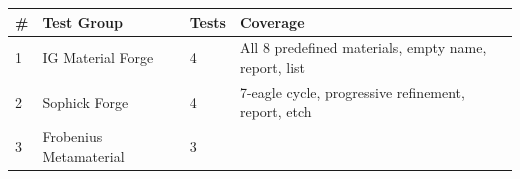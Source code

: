 \begin{longtable}[]{@{}llll@{}}
\toprule
\begin{minipage}[b]{0.09\columnwidth}\raggedright
\#\strut
\end{minipage} & \begin{minipage}[b]{0.31\columnwidth}\raggedright
Test Group\strut
\end{minipage} & \begin{minipage}[b]{0.20\columnwidth}\raggedright
Tests\strut
\end{minipage} & \begin{minipage}[b]{0.29\columnwidth}\raggedright
Coverage\strut
\end{minipage}\tabularnewline
\midrule
\endhead
\begin{minipage}[t]{0.09\columnwidth}\raggedright
1\strut
\end{minipage} & \begin{minipage}[t]{0.31\columnwidth}\raggedright
IG Material Forge\strut
\end{minipage} & \begin{minipage}[t]{0.20\columnwidth}\raggedright
4\strut
\end{minipage} & \begin{minipage}[t]{0.29\columnwidth}\raggedright
All 8 predefined materials, empty name, report, list\strut
\end{minipage}\tabularnewline
\begin{minipage}[t]{0.09\columnwidth}\raggedright
2\strut
\end{minipage} & \begin{minipage}[t]{0.31\columnwidth}\raggedright
Sophick Forge\strut
\end{minipage} & \begin{minipage}[t]{0.20\columnwidth}\raggedright
4\strut
\end{minipage} & \begin{minipage}[t]{0.29\columnwidth}\raggedright
7-eagle cycle, progressive refinement, report, etch\strut
\end{minipage}\tabularnewline
\begin{minipage}[t]{0.09\columnwidth}\raggedright
3\strut
\end{minipage} & \begin{minipage}[t]{0.31\columnwidth}\raggedright
Frobenius Metamaterial\strut
\end{minipage} & \begin{minipage}[t]{0.20\columnwidth}\raggedright
3\strut
\end{minipage} & \begin{minipage}[t]{0.29\columnwidth}\raggedright

\end{minipage}
\end{longtable}

